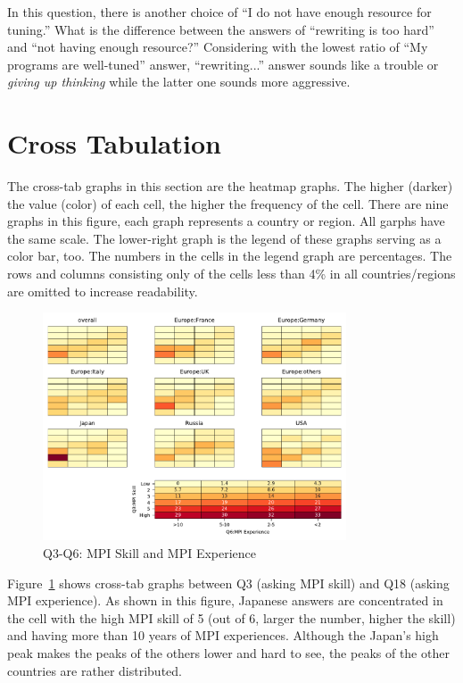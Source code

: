 \documentclass[submit,techrep,noauthor,english]{ipsj}
\begin{document}
In this question, there is another choice of ``I do not have
enough resource for tuning.'' What is the difference between the
answers of ``rewriting is too hard'' and ``not having enough
resource?'' Considering with the lowest ratio of ``My programs are
well-tuned'' answer, ``rewriting...'' answer sounds like a trouble or
{\it giving up thinking} while the latter one sounds more aggressive.

\section{Cross Tabulation}

The cross-tab graphs in this section are the heatmap graphs. The
higher (darker) the value (color) of each cell, the higher the
frequency of the cell. There are nine graphs in this figure, each
graph represents a country or region. All garphs have the same scale.
The lower-right graph is the legend of these graphs serving as a color
bar, too. The numbers in the cells in the legend graph are
percentages. The rows and columns consisting only of the cells less
than 4\% in all countries/regions are omitted to increase readability.

\begin{figure}[htb]
\begin{center}
\includegraphics[width=9cm]{../pdfs/Q3-Q6.pdf}
\caption{Q3-Q6: MPI Skill and MPI Experience}
\label{fig:q3-q6}
\end{center}
\end{figure}

Figure~\ref{fig:q3-q6} shows cross-tab graphs between
Q3 (asking MPI skill) and Q18 (asking MPI experience). As shown in
this figure, Japanese answers are concentrated in the cell with the high
MPI skill of 5 (out of 6, larger the number, higher the skill) and
having more than 10 years of MPI experiences. Although the Japan's
high peak makes the peaks of the others lower and hard to see, the
peaks of the other countries are rather distributed.  
\end{document}
